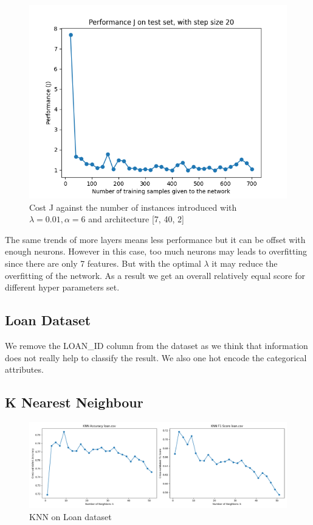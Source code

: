\documentclass[letterpaper]{article}
\begin{document}
\begin{figure}[H]
	\includegraphics[width=\textwidth]{figures/nn_titanic.csv_cost.png}
	\caption{Cost J against the number of instances introduced with $\lambda=0.01, \alpha=6$ and architecture [7, 40, 2]}
	\label{fig:nn-titanic}
\end{figure}

The same trends of more layers means less performance but it can be offset with enough neurons. However in this case, too much neurons
may leads to overfitting since there are only 7 features. But with the optimal $\lambda$ it may reduce the overfitting of the network.
As a result we get an overall relatively equal score for different hyper parameters set.

\subsection{Loan Dataset}

We remove the LOAN\_ID column from the dataset as we think that information does not really help to classify the result. We also one hot encode the categorical
attributes.
\subsection*{K Nearest Neighbour}
\begin{figure}[H]
	\includegraphics[width=\textwidth]{figures/knn_loan.csv.png}
	\caption{KNN on Loan dataset}
	\label{fig:knn-loan}
\end{figure}
\end{document}
